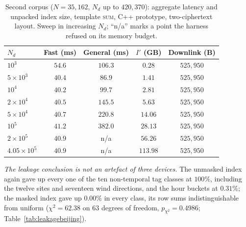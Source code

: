 \documentclass[a4paper,fleqn]{cas-sc}
\begin{document}
\begin{table}[pos=htbp]
\caption{Second corpus ($N=35{,}162$, $N_d$ up to $420{,}370$): aggregate
latency and unpacked index size, template \textsc{sum}, C++ prototype,
two-ciphertext layout. Sweep in increasing $N_d$; ``n/a'' marks a point the
harness refused on its memory budget.}
\label{tab:beijing}
\centering
\footnotesize
\setlength{\tabcolsep}{3pt}
\begin{tabular*}{\tblwidth}{@{\extracolsep{\fill}}lcccc@{}}
\toprule
$N_d$ & Fast (ms) & General (ms) & $I'$ (GB) & Downlink (B) \\
\midrule
$10^3$             & $54.6$ & $106.3$ & $0.28$   & $525{,}950$ \\
$5\times10^3$      & $40.4$ & $86.9$  & $1.41$   & $525{,}950$ \\
$10^4$             & $40.2$ & $99.7$  & $2.81$   & $525{,}950$ \\
$2\times10^4$      & $40.5$ & $145.5$ & $5.63$   & $525{,}950$ \\
$5\times10^4$      & $40.7$ & $220.8$ & $14.06$  & $525{,}950$ \\
$10^5$             & $41.2$ & $382.0$ & $28.13$  & $525{,}950$ \\
$2\times10^5$      & $40.9$ & n/a     & $56.26$  & $525{,}950$ \\
$4.05\times10^5$   & $40.9$ & n/a     & $113.98$ & $525{,}950$ \\
\bottomrule
\end{tabular*}
\end{table}

\emph{The leakage conclusion is not an artefact of three devices.} The
unmasked index again gave up every one of the ten non-temporal tag classes at
$100\%$, including the twelve sites and seventeen wind directions, and the
hour buckets at $0.31\%$; the masked index gave up $0.00\%$ in every class,
its row sums indistinguishable from uniform ($\chi^2=62.38$ on $63$ degrees of
freedom, $p_{\chi^2}=0.4986$; Table~\ref{tab:leakagebeijing}).
\end{document}
